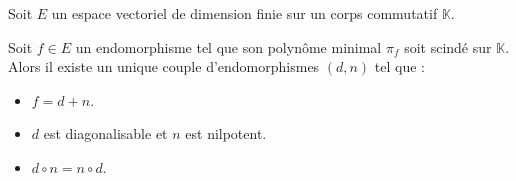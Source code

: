 





  Soit $E$ un espace vectoriel de dimension finie sur un corps commutatif $\mathbb{K}$.

  \begin{theorem}
    Soit $f \in E$ un endomorphisme tel que son polynôme minimal $\pi_f$ soit scindé sur $\mathbb{K}$. Alors il existe un unique couple d'endomorphismes $(d, n)$ tel que :
    \begin{itemize}
      \item $f = d + n$.
      \item $d$ est diagonalisable et $n$ est nilpotent.
      \item $d \circ n = n \circ d$.
    \end{itemize}
  \end{theorem}

